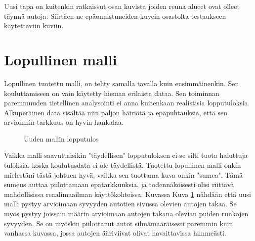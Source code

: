 Uusi tapa on kuitenkin ratkaissut osan kuvista joiden reuna alueet ovat olleet täynnä autoja. Siirtäen ne epäonnistuneiden kuvein osastolta testaukseen käytettäviin kuviin.

\section{Lopullinen malli}

Lopullinen tuotettu malli, on tehty samalla tavalla kuin ensimmäinenkin.
Sen kouluttamiseen on vain käytetty hieman erilaista dataa. Sen toiminnan paremmuuden tietellinen analysointi ei anna kuitenkaan realistisia lopputuloksia.
Alkuperäinen data sisältää niin paljon häiriötä ja epäpuhtauksia, että sen arvioinnin tarkkuus on hyvin hankalaa.

\begin{figure}[h]
\centering
{}
\caption{Uuden mallin lopputulos}
\label{fig:uusi_malli}
\end{figure}


Vaikka malli saavuttaisikin "täydellisen" lopputuloksen ei se silti tuota haluttuja tuloksia, koska koulutusdata ei ole täydellistä.
Tuotettu lopullinen malli onkin mielestäni tästä johtuen hyvä, vaikka sen tuottama kuva onkin "sumea". 
Tämä sumeus auttaa piilottamaan epätarkkuuksia, ja todennäköisesti olisi riittävä mahdollisissa reaalimaailman käyttökohteissa.
Kuvassa Kuva \ref{fig:uusi_malli} nähdään että uusi malli pystyy arvioimaan syvyyden autotien sivussa olevien autojen takaa. 
Se myös pystyy joissain määrin arvioimaan autojen takana olevian puiden runkojen syvyyden. 
Se on myöskin piilottanut autot silmämääräisesti paremmin kuin vanhassa kuvassa, jossa autojen ääriviivat olivat havaittavissa himmeästi.
